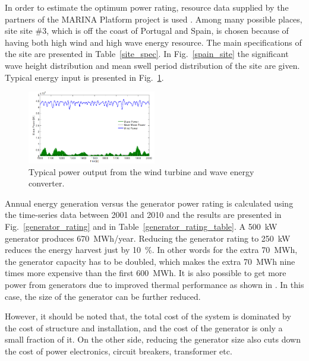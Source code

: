 \documentclass[twocolumn]{article}
\begin{document}
In order to estimate the optimum power rating, resource data supplied by the partners of the MARINA Platform project is used \cite{Gao2012}. Among many possible places, site site \#3, which is off the coast of Portugal and Spain, is chosen because of having both high wind and high wave energy resource. The main specifications of the site are presented in Table~\ref{site_spec}. In Fig.~\ref{spain_site} the significant wave height distribution and mean swell period distribution of the site are given. Typical energy input is presented in Fig.~\ref{power_input}.




  \begin{figure}[]
    \centering
    \includegraphics[width=0.5\textwidth]{power_input}
    \caption{Typical power output from the wind turbine and wave energy converter.} 
    \label{power_input}
  \end{figure}

Annual energy generation versus the generator power rating is calculated using the time-series data between 2001 and 2010 and the results are presented in Fig.~\ref{generator_rating} and in Table~\ref{generator_rating_table}. A 500~kW generator produces 670~MWh/year. Reducing the generator rating to 250~kW reduces the energy harvest just by 10~\%. In other words for the extra 70~MWh, the generator capacity has to be doubled, which makes the extra 70~MWh nine times more expensive than the first 600~MWh. It is also possible to get more power from generators due to improved thermal performance as shown in \cite{Hodgins2010a}. In this case, the size of the generator can be further reduced. 

However, it should be noted that, the total cost of the system is dominated by the cost of structure and installation, and the cost of the generator is only a small fraction of it. On the other side, reducing the generator size also cuts down the cost of power electronics, circuit breakers, transformer etc.
\end{document}

